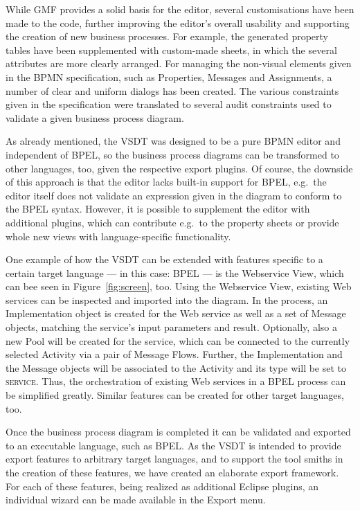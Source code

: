 While GMF provides a solid basis for the editor, several customisations have been
made to the code, further improving the editor's overall usability and supporting
the creation of new business processes.  For example, the generated property
tables have been supplemented with custom-made sheets, in which the several
attributes are more clearly arranged.  For managing the non-visual elements given
in the BPMN specification, such as Properties, Messages and Assignments, a number
of clear and uniform dialogs has been created.  The various constraints given in
the specification were translated to several audit constraints used to validate
a given business process diagram.

As already mentioned, the VSDT was designed to be a pure BPMN editor and independent
of BPEL, so the business process diagrams can be transformed to other languages,
too, given the respective export plugins.  Of course, the downside of this approach
is that the editor lacks built-in support for BPEL, e.g.\ the editor itself does
not validate an expression given in the diagram to conform to the BPEL syntax.
However, it is possible to supplement the editor with additional plugins, which
can contribute e.g.\ to the property sheets or provide whole new views with
language-specific functionality.

One example of how the VSDT can be extended with features specific to a certain
target language --- in this case: BPEL --- is the Webservice View, which can bee
seen in Figure~\ref{fig:screen}, too.  Using the Webservice View, existing Web
services can be inspected and imported into the diagram.  In the process, an
Implementation object is created for the Web service as well as a set of Message
objects, matching the service's input parameters and result.  Optionally, also a
new Pool will be created for the service, which can be connected to the currently
selected Activity via a pair of Message Flows.  Further, the Implementation and
the Message objects will be associated to the Activity and its type will be set
to \textsc{service}.  Thus, the orchestration of existing Web services in a BPEL
process can be simplified greatly.  Similar features can be created for other
target languages, too.

Once the business process diagram is completed it can be validated and exported
to an executable language, such as BPEL.  As the VSDT is intended to provide
export features to arbitrary target languages, and to support the tool smiths in
the creation of these features, we have created an elaborate export framework.
For each of these features, being realized as additional Eclipse plugins, an
individual wizard can be made available in the Export menu.

